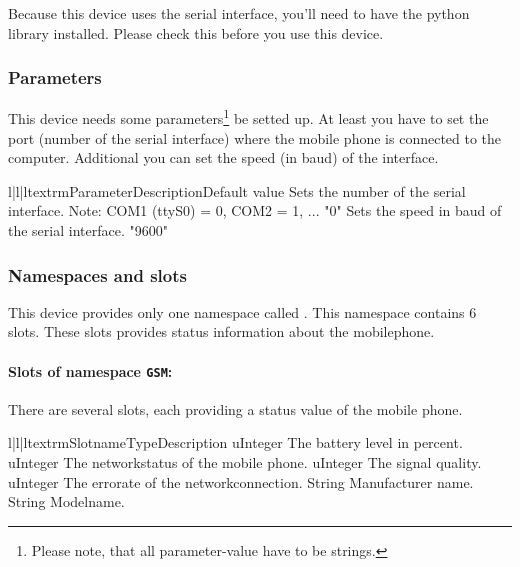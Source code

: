 \begin{notice}
Because this device uses the serial interface, you'll need to have the 
 python library installed. Please check this before you use 
this device.
\end{notice}

\subsubsection{Parameters}
This device needs some parameters\footnote{Please note, that all 
parameter-value have to be strings.} be setted up. At least you have to set 
the port (number of the serial interface) where the mobile phone is connected 
to the computer. Additional you can set the speed (in baud) of the interface.
\begin{tableiii}{l|l|l}{textrm}{Parameter}{Description}{Default value}
        {Sets the number of the serial interface. Note: COM1 (ttyS0) = 0, 
        COM2 = 1, ...} 
        {"0"}
        {Sets the speed in baud of the serial interface.}
        {"9600"}
\end{tableiii}

\subsubsection{Namespaces and slots}
This device provides only one namespace called . This namespace
contains 6 slots. These slots provides status information about the 
mobilephone.

\paragraph{Slots of namespace \texttt{GSM}:}
There are several slots, each providing a status value of the mobile phone.
\begin{tableiii}{l|l|l}{textrm}{Slotname}{Type}{Description}
        {uInteger}
        {The battery level in percent.}
        {uInteger}
        {The networkstatus of the mobile phone.}
        {uInteger}
        {The signal quality.}
        {uInteger}
        {The errorate of the networkconnection.}
        {String}
        {Manufacturer name.}
        {String}
        {Modelname.}
\end{tableiii}


